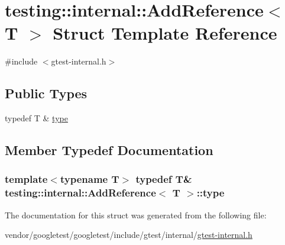 \hypertarget{structtesting_1_1internal_1_1AddReference}{}\section{testing\+:\+:internal\+:\+:Add\+Reference$<$ T $>$ Struct Template Reference}
\label{structtesting_1_1internal_1_1AddReference}


{\ttfamily \#include $<$gtest-\/internal.\+h$>$}

\subsection*{Public Types}
\begin{DoxyCompactItemize}
\item 
typedef T \& \hyperlink{structtesting_1_1internal_1_1AddReference_a2df8dd7c4e41f6390e6e66b1a9a67bb4}{type}
\end{DoxyCompactItemize}


\subsection{Member Typedef Documentation}
\subsubsection[{\texorpdfstring{type}{type}}]{\setlength{\rightskip}{0pt plus 5cm}template$<$typename T$>$ typedef T\& {\bf testing\+::internal\+::\+Add\+Reference}$<$ T $>$\+::{\bf type}}\hypertarget{structtesting_1_1internal_1_1AddReference_a2df8dd7c4e41f6390e6e66b1a9a67bb4}{}\label{structtesting_1_1internal_1_1AddReference_a2df8dd7c4e41f6390e6e66b1a9a67bb4}


The documentation for this struct was generated from the following file\+:\begin{DoxyCompactItemize}
\item 
vendor/googletest/googletest/include/gtest/internal/\hyperlink{gtest-internal_8h}{gtest-\/internal.\+h}\end{DoxyCompactItemize}
